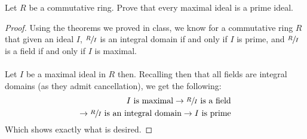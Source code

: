 \documentclass[12pt]{article}
\newenvironment{ex}[2][Exercise]{\begin{trivlist}
\item[\hskip \labelsep {\bfseries #1}\hskip \labelsep {\bfseries #2.}]}{\end{trivlist}}
\begin{document}
\begin{ex}{2}
    Let $R$ be a commutative ring. Prove that every maximal ideal is a prime ideal.
    \begin{proof}
        Using the theorems we proved in class, we know for a commutative ring $R$ that given an ideal $I$, $\sfrac{R}{I}$ is an integral domain if and only if $I$ is prime, and $\sfrac{R}{I}$ is a field if and only if $I$ is maximal. \\ \\
        Let $I$ be a maximal ideal in $R$ then. Recalling then that all fields are integral domains (as they admit cancellation), we get the following:
        \begin{equation}
            \begin{aligned}
                I \text{ is maximal} 
                \rightarrow \sfrac{R}{I} \text{ is a field} \\
                \rightarrow \sfrac{R}{I} \text{ is an integral domain} 
                \rightarrow I \text{ is prime}
            \end{aligned}
        \end{equation}
        Which shows exactly what is desired.
    \end{proof}
\end{ex}
\end{document}
